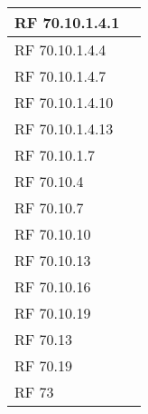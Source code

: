 {\begin{longtable} [c]{| p{2cm} | p{14cm} |}
 \hline 
RF 70.10.1.4.1 & \\ 
 \hline 
RF 70.10.1.4.4 & \\ 
 \hline 
RF 70.10.1.4.7 & \\ 
 \hline 
RF 70.10.1.4.10 & \\ 
 \hline 
RF 70.10.1.4.13 & \\ 
 \hline 
RF 70.10.1.7 & \\ 
 \hline 
RF 70.10.4 & \\ 
 \hline 
RF 70.10.7 & \\ 
 \hline 
RF 70.10.10 & \\ 
 \hline 
RF 70.10.13 & \\ 
 \hline 
RF 70.10.16 & \\ 
 \hline 
RF 70.10.19 & \\ 
 \hline 
RF 70.13 & \\ 
 \hline 
RF 70.19 & \\ 
 \hline 
RF 73 & \\ 
 \hline 
\end{longtable}}
